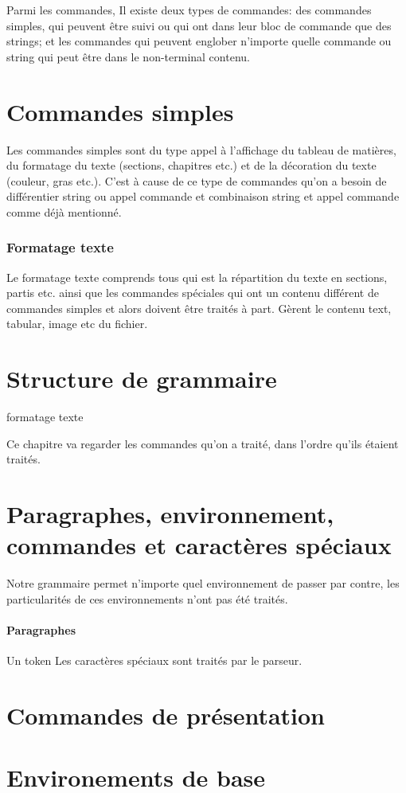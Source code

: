\documentclass{report}
\begin{document}
Parmi les commandes, Il existe deux types de commandes: des commandes simples, qui peuvent être suivi ou qui ont dans leur bloc de commande que des strings; et les commandes qui peuvent englober n'importe quelle commande ou string qui peut être dans le non-terminal contenu.

\section{Commandes simples}
Les commandes simples sont du type appel à l'affichage du tableau de matières, du formatage du texte (sections, chapitres etc.) et de la décoration du texte (couleur, gras etc.).
C'est à cause de ce type de commandes qu'on a besoin de différentier string ou appel commande et combinaison string et appel commande comme déjà mentionné.

\subsubsection{Formatage texte}
Le formatage texte comprends tous qui est la répartition du texte en sections, partis etc. ainsi que les commandes spéciales qui ont un contenu différent de commandes simples et alors doivent être traités à part.
Gèrent le contenu text, tabular, image etc du fichier.

\section{Structure de grammaire}
formatage texte
  
Ce chapitre va regarder les commandes qu'on a traité, dans l'ordre qu'ils étaient traités.
\section{Paragraphes, environnement, commandes et caractères spéciaux}
Notre grammaire permet n'importe quel environnement de passer par contre, les particularités de ces environnements n'ont pas été traités.
\paragraph{Paragraphes} Un token 
Les caractères spéciaux sont traités par le parseur.
\section{Commandes de présentation}
\section{Environements de base}
\end{document}
